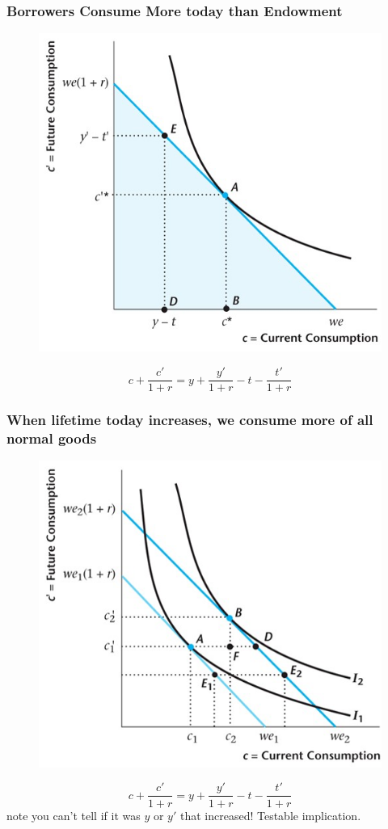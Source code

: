 \documentclass{beamer}
\begin{document}
\begin{frame}
\frametitle[alignment=center]{Borrowers Consume More today than Endowment}
\begin{figure}
\centering
\includegraphics[scale=0.5]{Figures/W_Fig_9pt4.png}
\end{figure}
$$c+\frac{c'}{1+r}=y+\frac{y'}{1+r}-t-\frac{t'}{1+r}$$
\end{frame}

\begin{frame}
\frametitle[alignment=center]{When lifetime today increases, we consume more of all normal goods}
\begin{figure}
\centering
\includegraphics[scale=0.5]{Figures/W_Fig_9pt5.png}
\end{figure}
$$c+\frac{c'}{1+r}=y+\frac{y'}{1+r}-t-\frac{t'}{1+r}$$
note you can't tell if it was $y$ or $y'$ that increased!  Testable implication.
\end{frame}
\end{document}
